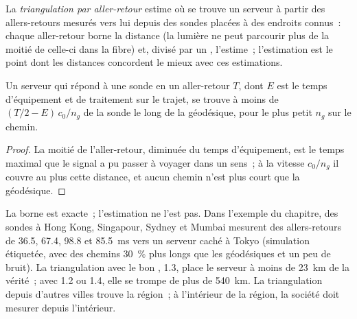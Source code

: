 \begin{definition}\label{def:nw:where-the-crypto-venues-live:tri}
La \emph{triangulation par aller-retour} estime où se trouve un serveur à partir des allers-retours mesurés vers lui depuis des sondes placées à des endroits connus~:
chaque aller-retour borne la distance (la lumière ne peut parcourir plus de la moitié de celle-ci dans la fibre) et, divisé par un , l'estime~;
l'estimation est le point dont les distances concordent le mieux avec ces estimations.
\end{definition}

\begin{proposition}\label{prop:nw:where-the-crypto-venues-live:bound}
Un serveur qui répond à une sonde en un aller-retour $T$, dont $E$ est le temps d'équipement et de traitement sur le trajet, se trouve à moins de $(T/2 - E)\,c_0/n_g$ de
la sonde le long de la géodésique, pour le plus petit  $n_g$ sur le chemin.
\end{proposition}

\begin{proof}
La moitié de l'aller-retour, diminuée du temps d'équipement, est le temps maximal que le signal a pu passer à voyager dans un sens~; à la vitesse $c_0/n_g$ il couvre au plus cette
distance, et aucun chemin n'est plus court que la géodésique.
\end{proof}

La borne est exacte~; l'estimation ne l'est pas. Dans l'exemple du chapitre, des sondes à Hong Kong, Singapour, Sydney et Mumbai mesurent des allers-retours de
36.5, 67.4, 98.8 et \qty{85.5}{\milli\second} vers un serveur caché à Tokyo (simulation étiquetée, avec des chemins 30~\% plus longs que les géodésiques
et un peu de bruit). La triangulation avec le bon , 1.3, place le serveur à moins de \qty{23}{\kilo\metre} de la vérité~; avec 1.2 ou 1.4, elle
se trompe de plus de \qty{540}{\kilo\metre}. La triangulation depuis d'autres villes trouve la région~; à l'intérieur de la région, la société doit
mesurer depuis l'intérieur.

